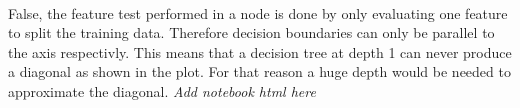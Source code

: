 %
%
%
%
%
%
%
\\
False, the feature test performed in a node is done by only evaluating one feature to split the training data. Therefore decision boundaries can only be parallel to the axis respectivly. This means that a decision tree at depth 1 can never produce a diagonal as shown in the plot. For that reason a huge depth would be needed to approximate the diagonal.
%
%
%
%
%
%
\textit{Add notebook html here}




